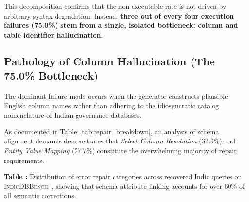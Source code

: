 \documentclass[conference]{IEEEtran}
\begin{document}
This decomposition confirms that the non-executable rate is not driven by arbitrary syntax degradation. Instead, \textbf{three out of every four execution failures (75.0\%) stem from a single, isolated bottleneck: column and table identifier hallucination}.

\subsection{Pathology of Column Hallucination (The 75.0\% Bottleneck)}
The dominant failure mode occurs when the generator constructs plausible English column names rather than adhering to the idiosyncratic catalog nomenclature of Indian governance databases.

As documented in Table~\ref{tab:repair_breakdown}, an analysis of schema alignment demands demonstrates that \emph{Select Column Resolution} (32.9\%) and \emph{Entity Value Mapping} (27.7\%) constitute the overwhelming majority of repair requirements.

\begin{table}[htbp]
\centering
\renewcommand{\arraystretch}{1.2}
\vspace{6pt}
\label{tab:repair_breakdown}
\begin{flushleft}
\small\textbf{Table \thetable:} Distribution of error repair categories across recovered Indic queries on \textsc{IndicDBBench}~\cite{dawar2026indicdbbench}, showing that schema attribute linking accounts for over 60\% of all semantic corrections.
\end{flushleft}
\end{table}
\end{document}
